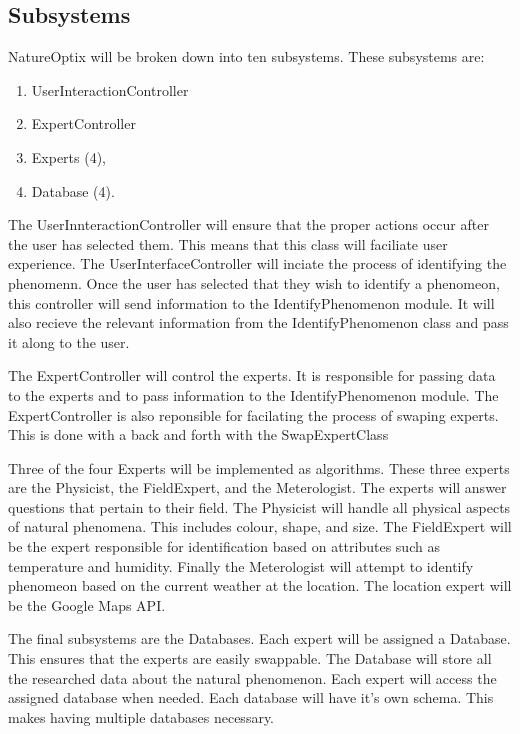 \documentclass[]{article}
\begin{document}
\subsection{Subsystems}
\label{sub:subsystems}
NatureOptix will be broken down into ten subsystems. These subsystems are:

\begin{enumerate}
	\item UserInteractionController
	\item ExpertController 
	\item Experts (4),
	\item Database (4).
\end{enumerate}

 The UserInnteractionController will ensure that the proper actions occur after the user has selected them. This means that this class will faciliate user experience. The UserInterfaceController will inciate the process of identifying the phenomenn. Once the user has selected that they wish to identify a phenomeon, this controller will send information to the IdentifyPhenomenon module. It will also recieve the relevant information from the IdentifyPhenomenon class and pass it along to the user.\newline 
 
 The ExpertController will control the experts. It is responsible for passing data to the experts and to pass information to the IdentifyPhenomenon module. The ExpertController is also reponsible for facilating the process of swaping experts. This is done with a back and forth with the SwapExpertClass\newline

Three of the four Experts will be implemented as algorithms. These three experts are the Physicist, the FieldExpert, and the Meterologist. The experts will answer questions that pertain to their field. The Physicist will handle all physical aspects of natural phenomena. This includes colour, shape, and size. The FieldExpert will be the expert responsible for identification based on attributes such as temperature and humidity. Finally the Meterologist will attempt to identify phenomeon based on the current weather at the location. The location expert will be the Google Maps API.\newline

The final subsystems are the Databases. Each expert will be assigned a Database. This ensures that the experts are easily swappable. The Database will store all the researched data about the natural phenomenon. Each expert will access the assigned database when needed. Each database will have it's own schema. This makes having multiple databases necessary.
\end{document}
